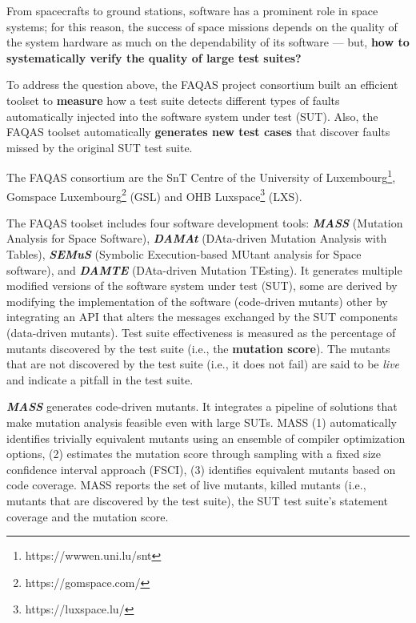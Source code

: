 \documentclass[a4paper]{report}
\begin{document}

From spacecrafts to ground stations, software has a prominent role in space systems; for this reason, the success of space missions depends on the quality of the system hardware as much on the dependability of its software --- but, \textbf{how to systematically verify the quality of large test suites?} 

To address the question above, the FAQAS project consortium built an efficient toolset to 
\textbf{measure} how a test suite detects different types of faults automatically injected into the software system under test (SUT). Also, the FAQAS toolset automatically \textbf{generates new test cases} that discover faults missed by the original SUT test suite.

The FAQAS consortium are the SnT Centre of the University of Luxembourg\footnote{https://wwwen.uni.lu/snt}, Gomspace Luxembourg\footnote{https://gomspace.com/} (GSL) and OHB Luxspace\footnote{https://luxspace.lu/} (LXS).

The FAQAS toolset includes four software development tools:
\textbf{\emph{MASS}} (Mutation Analysis for Space Software), 
\textbf{\emph{DAMAt}} (DAta-driven Mutation Analysis with Tables), 
\textbf{\emph{SEMuS}} (Symbolic Execu\-tion-based MUtant analysis for Space software),
and \textbf{\emph{DAMTE}} (DAta-driven Mutation TEsting).
It generates multiple modified versions of the software system under test (SUT), some are derived by modifying the implementation of the software (code-driven mutants) other by integrating an API that alters the messages exchanged by the SUT components (data-driven mutants). 
Test suite effectiveness is measured as the percentage of mutants discovered by the test suite (i.e., the \textbf{mutation score}). The mutants that are not discovered by the test suite (i.e., it does not fail) are said to be \emph{live} and indicate a pitfall in the test suite.

\textbf{\emph{MASS}} generates code-driven mutants. It integrates a pipeline of solutions that make mutation analysis feasible even with large SUTs. MASS (1) automatically identifies trivially equivalent mutants using an ensemble of compiler optimization options, (2) estimates the mutation score through sampling with a fixed size confidence interval approach (FSCI), (3) identifies equivalent mutants based on code coverage. 
MASS reports the set of live mutants, killed mutants (i.e., mutants that are discovered by the test suite), the SUT test suite's statement coverage and the mutation score.
\end{document}
